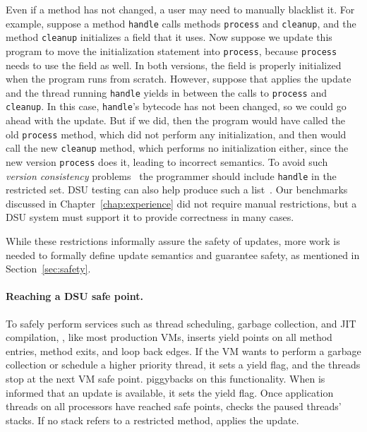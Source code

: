 Even if a method has not changed, a user may need to manually blacklist it.
For example, suppose a method \texttt{handle} calls methods
\texttt{process} and \texttt{cleanup}, and the method \texttt{cleanup}
initializes a field that it uses.  Now suppose we update this program to
move the initialization statement into \texttt{process}, because
\texttt{process} needs to use the field as well.  In both versions, the
field is properly initialized when the program runs from scratch.  However,
suppose that \JV  applies the update and the thread running
\texttt{handle} yields in between the calls to \texttt{process} and
\texttt{cleanup}.  In this case, \texttt{handle}'s bytecode has not been
changed, so we could go ahead with the update.  But if we did, then the
program would have called the old \texttt{process} method, which did not
perform any initialization, and then would call the new \texttt{cleanup}
method, which performs no initialization either, since the new version
\texttt{process} does it, leading to incorrect semantics.  To avoid such
\emph{version consistency} problems~\cite{neamtiu08context} the programmer
should include \texttt{handle} in the restricted set. DSU testing can also
help produce such a list~\cite{dsu-testing}.
Our benchmarks
discussed in Chapter~\ref{chap:experience} did not require manual
restrictions, but a DSU system must support it to provide correctness in
many cases.

While these restrictions informally assure the safety of updates,
more work is needed to formally define update semantics and guarantee
safety, as mentioned in Section~\ref{sec:safety}.

\paragraph{Reaching a DSU safe point.} To safely perform \VM services such
as thread scheduling, garbage collection, and JIT compilation, \RVM, like
most production VMs, inserts yield points on all method entries, method
exits, and loop back edges.  If the VM wants to perform a garbage
collection or schedule a higher priority thread, it sets a yield flag, and
the threads stop at the next VM safe point. \JV piggybacks on this
functionality.  When \JV is informed that an update is available, it sets
the yield flag.  Once application threads on all processors have reached
\VM safe points, \JV checks the paused threads' stacks.  If no stack
refers to a restricted method, \JV applies the update.  

